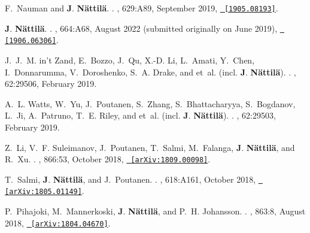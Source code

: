 \documentclass[letterpaper, onecolumn, 11pt]{article}
\begin{document}
\begin{thebibliography}{10}
F.~{Nauman} and \textbf{J}. \textbf{N{\"a}ttil{\"a}}.
.
\newblock {\em \aap}, 629:A89, September 2019,
  \href{http://arxiv.org/abs/1905.08193}{\nolinkurl{ [1905.08193]}}.

\textbf{J}. \textbf{N{\"a}ttil{\"a}}.
.
, 664:A68, August 2022 (submitted originally on June 2019),
  \href{http://arxiv.org/abs/1906.06306}{\nolinkurl{ [1906.06306]}}.

J.~J.~M. {in't Zand}, E.~{Bozzo}, J.~{Qu}, X.-D. {Li}, L.~{Amati}, Y.~{Chen},
  I.~{Donnarumma}, V.~{Doroshenko}, S.~A. {Drake}, and {et~al. (incl.
  \textbf{J}. \textbf{{N{\"a}ttil{\"a}}})}.
.
, 62:29506,
  February 2019.

A.~L. {Watts}, W.~{Yu}, J.~{Poutanen}, S.~{Zhang}, S.~{Bhattacharyya},
  S.~{Bogdanov}, L.~{Ji}, A.~{Patruno}, T.~E. {Riley}, and {et~al. (incl.
  \textbf{J}. \textbf{{N{\"a}ttil{\"a}}})}.
.
, 62:29503,
  February 2019.

Z.~{Li}, V.~F. {Suleimanov}, J.~{Poutanen}, T.~{Salmi}, M.~{Falanga},
  \textbf{J}. {\textbf{N{\"a}ttil{\"a}}}, and R.~{Xu}.
.
\newblock {\em \apj}, 866:53, October 2018,
  \href{http://arxiv.org/abs/1809.00098}{\nolinkurl{ [arXiv:1809.00098]}}.

T.~{Salmi}, \textbf{J}. \textbf{{N{\"a}ttil{\"a}}}, and J.~{Poutanen}.
.
\newblock {\em \aap}, 618:A161, October 2018,
  \href{http://arxiv.org/abs/1805.01149}{\nolinkurl{ [arXiv:1805.01149]}}.

P.~{Pihajoki}, M.~{Mannerkoski}, \textbf{J}. \textbf{{N{\"a}ttil{\"a}}}, and
  P.~H. {Johansson}.
.
\newblock {\em \apj}, 863:8, August 2018,
  \href{http://arxiv.org/abs/1804.04670}{\nolinkurl{ [arXiv:1804.04670]}}.


\end{thebibliography}
\end{document}

